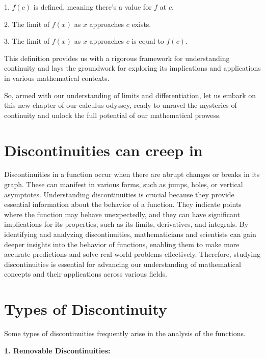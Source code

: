 1. \( f(c) \) is defined, meaning there's a value for \( f \) at \( c \).

2. The limit of \( f(x) \) as \( x \) approaches \( c \) exists.

3. The limit of \( f(x) \) as \( x \) approaches \( c \) is equal to \( f(c) \).

This definition provides us with a rigorous framework for understanding continuity and lays the groundwork for exploring its implications and applications in various mathematical contexts.

So, armed with our understanding of limits and differentiation, let us embark on this new chapter of our calculus odyssey, ready to unravel the mysteries of continuity and unlock the full potential of our mathematical prowess.

\section{Discontinuities can creep in}

Discontinuities in a function occur when there are abrupt changes or breaks in its graph. These can manifest in various forms, such as jumps, holes, or vertical asymptotes. Understanding discontinuities is crucial because they provide essential information about the behavior of a function. They indicate points where the function may behave unexpectedly, and they can have significant implications for its properties, such as its limits, derivatives, and integrals. By identifying and analyzing discontinuities, mathematicians and scientists can gain deeper insights into the behavior of functions, enabling them to make more accurate predictions and solve real-world problems effectively. Therefore, studying discontinuities is essential for advancing our understanding of mathematical concepts and their applications across various fields.

\section{Types of Discontinuity}

Some types of discontinuities frequently arise in the analysis of the functions.

\textbf{1. Removable Discontinuities:}

